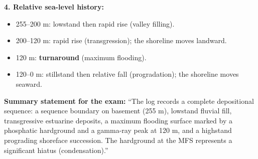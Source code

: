 \documentclass[11pt]{article}
\begin{document}
\begin{exoresolu}
\textbf{4. Relative sea-level history:}
\begin{itemize}
    \item 255--200 m: lowstand then rapid rise (valley filling).
    \item 200--120 m: rapid rise (transgression); the shoreline moves landward.
    \item 120 m: \textbf{turnaround} (maximum flooding).
    \item 120--0 m: stillstand then relative fall (progradation); the shoreline moves seaward.
\end{itemize}

\textbf{Summary statement for the exam:} ``The log records a complete depositional sequence: a sequence boundary on basement (255 m), lowstand fluvial fill, transgressive estuarine deposits, a maximum flooding surface marked by a phosphatic hardground and a gamma-ray peak at 120 m, and a highstand prograding shoreface succession. The hardground at the MFS represents a significant hiatus (condensation).''
\end{exoresolu}
\end{document}
